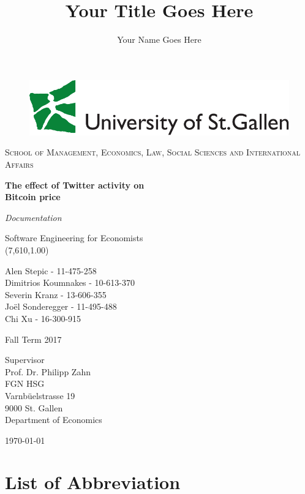 \documentclass[a4paper,12pt]{article}
\title{Your Title Goes Here}
\author{Your Name Goes Here}
\begin{document}
\begin{titlepage}
	\begin{figure}
	\centering
	\includegraphics[scale=0.32]{logohsg}
	\end{figure}
\centering
\centering
{\scshape\large School of Management, Economics, Law, Social Sciences and International Affairs \par}
\vspace{1.7cm}
{\huge\bfseries The effect of Twitter activity on \\ Bitcoin price\par}
\vspace{1.0cm}
{\Huge\itshape Documentation\par}
\vspace{1.0cm}     
{\Large Software Engineering for Economists \\ (7,610,1.00) \par}
\vspace{1.2cm}
{Alen Stepic - 11-475-258 \\ Dimitrios Koumnakes - 10-613-370 \\ Severin Kranz - 13-606-355 \\ Joël Sonderegger - 11-495-488 \\ Chi Xu - 16-300-915 \par}
\vspace{1.2cm}
Fall Term 2017 \\
\vspace{1.2cm}
{Supervisor\\ Prof. Dr. Philipp Zahn\\ FGN HSG\\ Varnbüelstrasse 19\\ 9000 St. Gallen\\ Department of Economics\par}
\vspace{0.8cm}
{\centering\today\par}
\end{titlepage}

\clearpage

\tableofcontents

\clearpage
    
\listoffigures\bigskip 
\section*{List of Abbreviation} 
\begin{acronym}[ASECRETTT]
\end{acronym}
\end{document}
